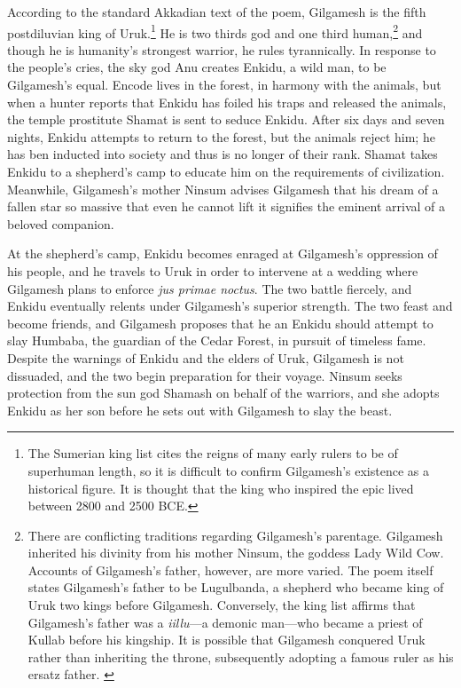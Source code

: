 \documentclass[10pt,a4paper]{article}
\begin{document}
According to the standard Akkadian text of the poem, Gilgamesh is the fifth postdiluvian king of Uruk.\footnote{The Sumerian king list cites the reigns of many early rulers to be of superhuman length, so it is difficult to confirm Gilgamesh’s existence as a historical figure. It is thought that the king who inspired the epic lived between 2800 and 2500 BCE.\cite{dalley2000myths}} He is two thirds god and one third human,\footnote{There are conflicting traditions regarding Gilgamesh’s parentage. Gilgamesh inherited his divinity from his mother Ninsum, the goddess Lady Wild Cow. Accounts of Gilgamesh’s father, however, are more varied. The poem itself states Gilgamesh’s father to be Lugulbanda, a shepherd who became king of Uruk two kings before Gilgamesh. Conversely, the king list affirms that Gilgamesh’s father was a \emph{iillu}—a demonic man—who became a priest of Kullab before his kingship. It is possible that Gilgamesh conquered Uruk rather than inheriting the throne, subsequently adopting a famous ruler as his ersatz father. \cite{dalley2000myths}} and though he is humanity’s strongest warrior, he rules tyrannically. In response to the people’s cries, the sky god Anu creates Enkidu, a wild man, to be Gilgamesh’s equal. Encode lives in the forest, in harmony with the animals, but when a hunter reports that Enkidu has foiled his traps and released the animals, the temple prostitute Shamat is sent to seduce Enkidu. After six days and seven nights, Enkidu attempts to return to the forest, but the animals reject him; he has ben inducted into society and thus is no longer of their rank. Shamat takes Enkidu to a shepherd’s camp to educate him on the requirements of civilization. Meanwhile, Gilgamesh’s mother Ninsum advises Gilgamesh that his dream of a fallen star so massive that even he cannot lift it signifies the eminent arrival of a beloved companion.

At the shepherd’s camp, Enkidu becomes enraged at Gilgamesh’s oppression of his people, and he travels to Uruk in order to intervene at a wedding where Gilgamesh plans to enforce \emph{jus primae noctus}. The two battle fiercely, and Enkidu eventually relents under Gilgamesh’s superior strength. The two feast and become friends, and Gilgamesh proposes that he an Enkidu should attempt to slay Humbaba, the guardian of the Cedar Forest, in pursuit of timeless fame. Despite the warnings of Enkidu and the elders of Uruk, Gilgamesh is not dissuaded, and the two begin preparation for their voyage. Ninsum seeks protection from the sun god Shamash on behalf of the warriors, and she adopts Enkidu as her son before he sets out with Gilgamesh to slay the beast.
\end{document}
